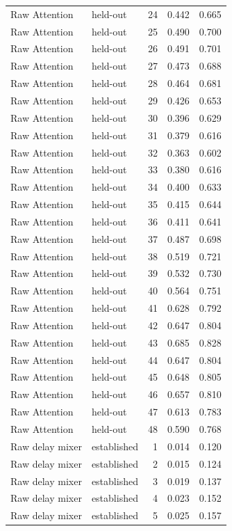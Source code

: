 \begin{tabular}{llrrr}
Raw Attention & held-out & 24 & 0.442 & 0.665 \\
Raw Attention & held-out & 25 & 0.490 & 0.700 \\
Raw Attention & held-out & 26 & 0.491 & 0.701 \\
Raw Attention & held-out & 27 & 0.473 & 0.688 \\
Raw Attention & held-out & 28 & 0.464 & 0.681 \\
Raw Attention & held-out & 29 & 0.426 & 0.653 \\
Raw Attention & held-out & 30 & 0.396 & 0.629 \\
Raw Attention & held-out & 31 & 0.379 & 0.616 \\
Raw Attention & held-out & 32 & 0.363 & 0.602 \\
Raw Attention & held-out & 33 & 0.380 & 0.616 \\
Raw Attention & held-out & 34 & 0.400 & 0.633 \\
Raw Attention & held-out & 35 & 0.415 & 0.644 \\
Raw Attention & held-out & 36 & 0.411 & 0.641 \\
Raw Attention & held-out & 37 & 0.487 & 0.698 \\
Raw Attention & held-out & 38 & 0.519 & 0.721 \\
Raw Attention & held-out & 39 & 0.532 & 0.730 \\
Raw Attention & held-out & 40 & 0.564 & 0.751 \\
Raw Attention & held-out & 41 & 0.628 & 0.792 \\
Raw Attention & held-out & 42 & 0.647 & 0.804 \\
Raw Attention & held-out & 43 & 0.685 & 0.828 \\
Raw Attention & held-out & 44 & 0.647 & 0.804 \\
Raw Attention & held-out & 45 & 0.648 & 0.805 \\
Raw Attention & held-out & 46 & 0.657 & 0.810 \\
Raw Attention & held-out & 47 & 0.613 & 0.783 \\
Raw Attention & held-out & 48 & 0.590 & 0.768 \\
Raw delay mixer & established & 1 & 0.014 & 0.120 \\
Raw delay mixer & established & 2 & 0.015 & 0.124 \\
Raw delay mixer & established & 3 & 0.019 & 0.137 \\
Raw delay mixer & established & 4 & 0.023 & 0.152 \\
Raw delay mixer & established & 5 & 0.025 & 0.157 \\

\end{tabular}
